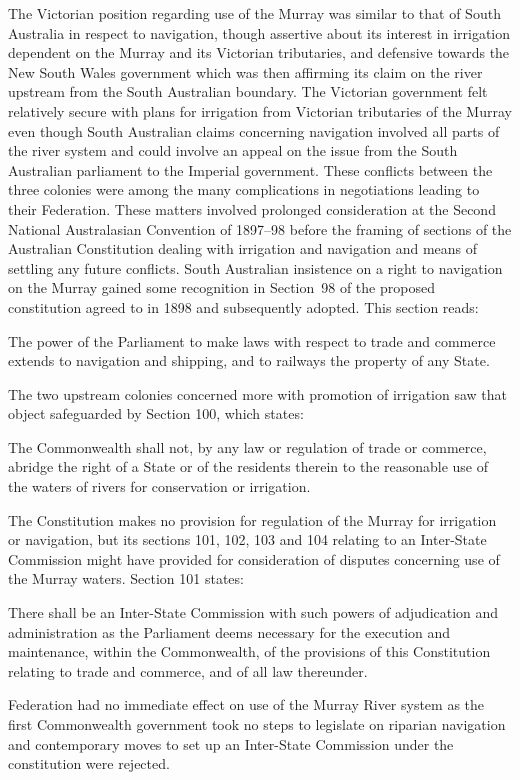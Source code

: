 The Victorian position regarding use of the Murray was similar to that
of South Australia in respect to navigation, though assertive about
its interest in irrigation dependent on the Murray and its Victorian
tributaries, and defensive towards the New South Wales government
which was then affirming its claim on the river upstream from the
South Australian boundary.  The Victorian government felt relatively
secure with plans for irrigation from Victorian tributaries of the
Murray even though South Australian claims concerning navigation
involved all parts of the river system and could involve an appeal on
the issue from the South Australian parliament to the Imperial
government.  These conflicts between the three colonies were among the
many complications in negotiations leading to their Federation.  These
matters involved prolonged consideration at the Second National
Australasian Convention of 1897--98 before the framing of sections of
the Australian Constitution  dealing
with irrigation and navigation and means of settling any future
conflicts.  South Australian insistence on a right to navigation
 on the Murray gained some recognition in Section~98
of the proposed constitution agreed to in 1898 and subsequently
adopted.  This section reads:
\begin{Quote}
	The power of the Parliament to make laws with respect to trade
	and commerce extends to navigation and shipping, and to
	railways the property of any State.
\end{Quote}

The two upstream colonies concerned more with promotion of irrigation
saw that object safeguarded by Section 100, which states:
\begin{Quote}
	The Commonwealth shall not, by any law or regulation of trade
	or commerce, abridge the right of a State or of the residents
	therein to the reasonable use of the waters of rivers for
	conservation or irrigation.
\end{Quote}

The Constitution makes no provision for regulation of the Murray for
irrigation or navigation, but its sections 101, 102, 103 and 104
relating to an Inter-State Commission might have provided for
consideration of disputes concerning use of the Murray waters.
Section 101 states:
\begin{Quote}
	There shall be an Inter-State Commission with such powers of
	adjudication and administration as the Parliament deems
	necessary for the execution and maintenance, within the
	Commonwealth, of the provisions of this Constitution relating
	to trade and commerce, and of all law thereunder.
\end{Quote}
Federation had no immediate effect on use of the Murray River system
as the first Commonwealth government took no steps to legislate on
riparian navigation and contemporary moves to set up an Inter-State
Commission under the constitution were
rejected.


